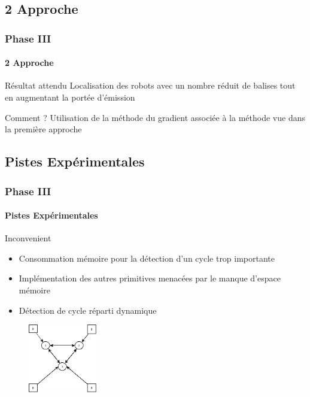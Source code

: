 \documentclass[xcolor=table]{beamer}
\begin{document}
\subsection{2 Approche}
\begin{frame}
  \frametitle{Phase III}
  \framesubtitle{2 Approche}
  \begin{block}{Résultat attendu}
    Localisation des robots avec un nombre réduit de balises tout en augmentant la portée d'émission
  \end{block}
  \begin{block}{Comment ?}
    Utilisation de la méthode du gradient associée à la méthode vue dans la première approche
  \end{block}
\end{frame}

\subsection{Pistes Expérimentales}
\begin{frame}
  \frametitle{Phase III}
  \framesubtitle{Pistes Expérimentales}
  \begin{block}{Inconvenient}
    \begin{itemize}
      [triangle]
    \item Consommation mémoire pour la détection d'un cycle trop importante \pause
    \item Implémentation des autres primitives menacées par le manque d'espace mémoire \pause
    \item Détection de cycle réparti dynamique
    \end{itemize}
  \end{block}
  \pause
  \begin{figure}[!h]
    \includegraphics[width=3cm]{schema_cycle.png}
  \end{figure}
\end{frame}

\end{document}
